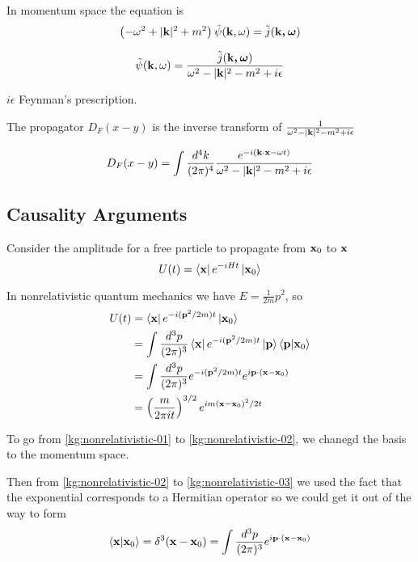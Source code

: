 In momentum space the equation is
$$
\left( -\omega^2 + |\boldsymbol{\mathbf{k}}|^2 + m^2 \right) \tilde{\psi}(\boldsymbol{\mathbf{k}}, \omega) = \tilde{j}(\boldsymbol{\mathbf{\boldsymbol{\mathbf{k}}, \omega}})
$$

$$
\tilde{\psi}(\boldsymbol{\mathbf{k}}, \omega) = \frac{ \tilde{j}(\boldsymbol{\mathbf{\boldsymbol{\mathbf{k}}, \omega}}) }{ \omega^2 - |\boldsymbol{\mathbf{k}}|^2 - m^2 + i\epsilon }
$$

$i\epsilon$ Feynman's prescription.

The propagator $D_F(x-y)$ is the inverse transform of
$\frac{ 1 }{ \omega^2 - |\boldsymbol{\mathbf{k}}|^2 - m^2 + i\epsilon }$

$$
D_F(x-y) = \int \frac{d^4k}{(2\pi)^4}
    \frac{ e^{-i(\boldsymbol{\mathbf{k}}\cdot\boldsymbol{\mathbf{x}} -\omega t)} }{ \omega^2 - |\boldsymbol{\mathbf{k}}|^2 - m^2 + i\epsilon }
$$






\subsection{Causality Arguments}

Consider the amplitude for a free particle to propagate from $\boldsymbol{\mathbf{x}}_0$ to $\boldsymbol{\mathbf{x}}$
$$
U(t) = \bra{\boldsymbol{\mathbf{x}}} e^{-iHt} \ket{\boldsymbol{\mathbf{x}}_0}
$$

In nonrelativistic quantum mechanics we have $E = \frac{1}{2m} p^2$, so
\begin{align}
U(t) &= \bra{\boldsymbol{\mathbf{x}}} e^{-i(\boldsymbol{\mathbf{p}}^2/2m)t} \ket{\boldsymbol{\mathbf{x}}_0} \label{kg:nonrelativistic-01} \\
&= \int \frac{d^3p}{(2\pi)^3} \bra{\boldsymbol{\mathbf{x}}} e^{-i(\boldsymbol{\mathbf{p}}^2/2m)t} \ket{\boldsymbol{\mathbf{p}}} \braket{\boldsymbol{\mathbf{p}} | \boldsymbol{\mathbf{x}}_0} \label{kg:nonrelativistic-02} \\
&= \int \frac{d^3p}{(2\pi)^3} e^{-i(\boldsymbol{\mathbf{p}}^2/2m)t} e^{i\boldsymbol{\mathbf{p}}\cdot(\boldsymbol{\mathbf{x}}-\boldsymbol{\mathbf{x}}_0)} \label{kg:nonrelativistic-03} \\
&= \left( \frac{m}{2\pi i t} \right)^{3/2} e^{im (\boldsymbol{\mathbf{x}}-\boldsymbol{\mathbf{x}}_0)^2 /2t} \label{kg:nonrelativistic-04}
\end{align}



To go from \ref{kg:nonrelativistic-01} to \ref{kg:nonrelativistic-02},
we chanegd the basis to the momentum space.

Then from \ref{kg:nonrelativistic-02} to \ref{kg:nonrelativistic-03} we used the fact that the exponential corresponds
to a Hermitian operator so we could get it out of the way to form
$$
\braket{\boldsymbol{\mathbf{x}} | \boldsymbol{\mathbf{x}}_0} = \delta^{3} (\boldsymbol{\mathbf{x}} - \boldsymbol{\mathbf{x}}_0)
= \int \frac{d^3p}{(2\pi)^3} e^{i\boldsymbol{\mathbf{p}}\cdot (\boldsymbol{\mathbf{x}} - \boldsymbol{\mathbf{x}}_0)}
$$


